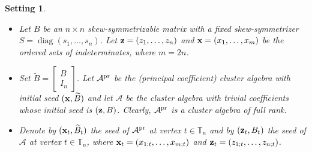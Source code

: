 \documentclass[12pt]{amsart}
\newtheorem{setting}[theorem]{Setting}
\theoremstyle{definition}
\theoremstyle{remark}
\numberwithin{equation}{section}
\newcommand{\diag}{\operatorname{diag}}
\begin{document}
\begin{setting}\label{setting}
\begin{itemize}
\item[(i)] Let $B$ be an $n\times n$ skew-symmetrizable matrix with a fixed skew-symmetrizer $S=\diag(s_1,\ldots,s_n)$. Let ${\bf z}=(z_1,\ldots,z_n)$ and ${\bf x}=(x_1,\ldots,x_m)$ be the ordered sets of indeterminates, where $m=2n$.
\item[(ii)]  Set $\widetilde B=\begin{bmatrix}
    B\\ I_n
\end{bmatrix}$. Let $\mathcal A^{\rm pr}$ be the (principal coefficient) cluster algebra with initial seed $({\bf x},\widetilde B)$ and let $\mathcal A$ be the cluster algebra with trivial coefficients whose initial seed is $({\bf z},B)$. Clearly, $\mathcal A^{\rm pr}$ is a cluster algebra of full rank.
\item[(iii)] Denote by $({\bf x}_t,\widetilde B_t)$ the seed of $\mathcal A^{\rm pr}$ at vertex $t\in\mathbb T_n$ and by  $({\bf z}_t, B_t)$ the seed of $\mathcal A$ at vertex $t\in\mathbb T_n$, where ${\bf x}_t=(x_{1;t},\ldots,x_{m;t})$ and ${\bf z}_t=(z_{1;t},\ldots,z_{n;t})$.
\end{itemize}
\end{setting}
\end{document}
